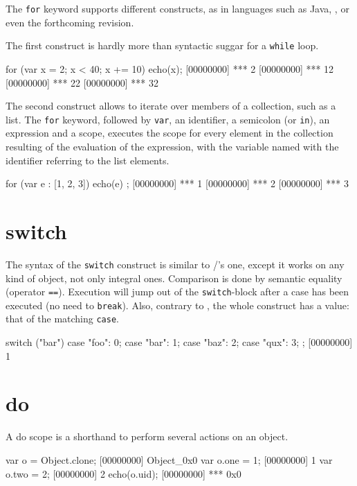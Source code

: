 The \lstinline{for} keyword supports different constructs, as in
languages such as Java, \Cs, or even the forthcoming \Cxx revision.

The first construct is hardly more than syntactic suggar for a
\lstinline{while} loop.

\begin{urbiscript}
for (var x = 2; x < 40; x += 10)
  echo(x);
[00000000] *** 2
[00000000] *** 12
[00000000] *** 22
[00000000] *** 32
\end{urbiscript}

The second construct allows to iterate over members of a collection,
such as a list. The \lstinline{for} keyword, followed by
\lstinline|var|, an identifier, a semicolon (or \lstinline|in|), an
expression and a scope, executes the scope for every element in the
collection resulting of the evaluation of the expression, with the
variable named with the identifier referring to the list
elements.

\begin{urbiscript}
for (var e : [1, 2, 3]) { echo(e) };
[00000000] *** 1
[00000000] *** 2
[00000000] *** 3
\end{urbiscript}

\section{switch}

The syntax of the \lstinline|switch| construct is similar to \C/\Cxx's
one, except it works on any kind of object, not only integral
ones. Comparison is done by semantic equality (operator
\lstinline{==}). Execution will jump out of the
\lstinline|switch|-block after a case has been executed (no need to
\lstinline{break}).  Also, contrary to \Cxx, the whole construct has a
value: that of the matching \lstinline{case}.

\begin{urbiscript}
switch ("bar")
{
  case "foo":  0;
  case "bar":  1;
  case "baz":  2;
  case "qux":  3;
};
[00000000] 1
\end{urbiscript}

\section{do}
\label{section:constructs/do}

A do scope is a shorthand to perform several actions on an
object.

\begin{urbiscript}
var o = Object.clone;
[00000000] Object_0x0
var o.one = 1;
[00000000] 1
var o.two = 2;
[00000000] 2
echo(o.uid);
[00000000] *** 0x0
\end{urbiscript}

